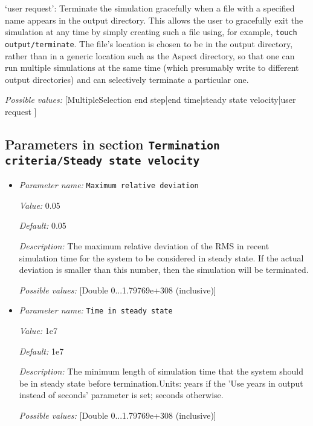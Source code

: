 \begin{itemize}
`user request': Terminate the simulation gracefully when a file with a specified name appears in the output directory. This allows the user to gracefully exit the simulation at any time by simply creating such a file using, for example, \texttt{touch output/terminate}. The file's location is chosen to be in the output directory, rather than in a generic location such as the Aspect directory, so that one can run multiple simulations at the same time (which presumably write to different output directories) and can selectively terminate a particular one.


{\it Possible values:} [MultipleSelection end step|end time|steady state velocity|user request ]
\end{itemize}



\subsection{Parameters in section \tt Termination criteria/Steady state velocity}
\label{parameters:Termination_20criteria/Steady_20state_20velocity}

\begin{itemize}
\item {\it Parameter name:} {\tt Maximum relative deviation}
\label{parameters:Termination criteria/Steady state velocity/Maximum relative deviation}


{\it Value:} 0.05


{\it Default:} 0.05


{\it Description:} The maximum relative deviation of the RMS in recent simulation time for the system to be considered in steady state. If the actual deviation is smaller than this number, then the simulation will be terminated.


{\it Possible values:} [Double 0...1.79769e+308 (inclusive)]
\item {\it Parameter name:} {\tt Time in steady state}
\label{parameters:Termination criteria/Steady state velocity/Time in steady state}


{\it Value:} 1e7


{\it Default:} 1e7


{\it Description:} The minimum length of simulation time that the system should be in steady state before termination.Units: years if the 'Use years in output instead of seconds' parameter is set; seconds otherwise.


{\it Possible values:} [Double 0...1.79769e+308 (inclusive)]
\end{itemize}


